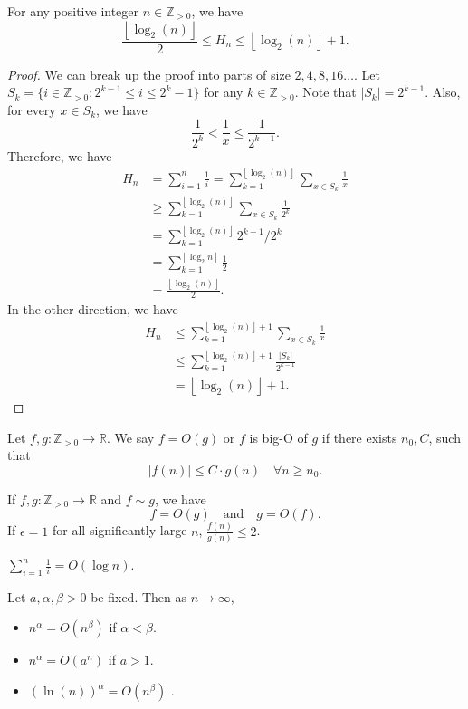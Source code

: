 \begin{lemma}
	For any positive integer \( n \in \mathbb{Z}_{>0} \), we have \[
		\frac{\left\lfloor \log _2(n) \right\rfloor}{2} \le H_n \le \left\lfloor \log _2(n) \right\rfloor + 1
	.\] 
\end{lemma}
\begin{proof}
	We can break up the proof into parts of size \( 2,4,8,16\ldots  \). Let \( S_k=\{i \in \mathbb{Z}_{>0} : 2^{k-1} \le i \le 2^{k}-1   \}   \) for any \( k \in \mathbb{Z}_{>0} \). Note that \( |S_k| = 2^{k-1}  \). Also, for every \( x \in  S_k \), we have \[
		\frac{1}{2^{k} } < \frac{1}{x} \le \frac{1}{2^{k-1} }
	.\] 
	Therefore, we have 
	\begin{align*}
		H_n &= \sum_{i=1}^{n} \frac{1}{i} = \sum_{k=1}^{\left\lfloor \log _2(n) \right\rfloor} \sum_{x \in S_k} \frac{1}{x} \\
				&\ge \sum_{k=1}^{\left\lfloor \log _2(n) \right\rfloor} \sum_{x \in S_k} \frac{1}{2^{k} } \\
		&= \sum_{k=1}^{\left\lfloor \log _2(n) \right\rfloor} 2^{k-1}/2^{k}   \\
		&= \sum_{k=1}^{\left\lfloor \log _2n \right\rfloor} \frac{1}{2} \\
		&= \frac{\left\lfloor \log _2(n) \right\rfloor}{2}
	.\end{align*}
	In the other direction, we have
	\begin{align*}
		H_n &\le \sum_{k=1}^{\left\lfloor \log _2(n) \right\rfloor+1} \sum_{x \in S_k} \frac{1}{x} \\
		&\le \sum_{k=1}^{\left\lfloor \log _2(n) \right\rfloor + 1} \frac{|S_k|}{2^{k-1} }  \\
		&= \left\lfloor \log _2(n) \right\rfloor + 1
	.\end{align*}
\end{proof}

\begin{definition}
	Let \( f,g : \mathbb{Z}_{>0}\to \mathbb{R} \). We say \( f=O(g) \) or \( f \) is big-O of \( g \) if there exists \( n_0,C \), such that \[
		|f(n)| \le C\cdot g(n) \quad \forall n\ge n_{0}
	.\] 
\end{definition}

\begin{note}
	If \( f,g :\mathbb{Z}_{>0}\to \mathbb{R} \) and \( f\sim g \), we have \[
		f=O(g) \quad \text{and} \quad g=O(f)
	.\] If \( \epsilon =1 \) for all significantly large \( n \), \( \frac{f(n)}{g(n)}\le 2 \).
\end{note}

\begin{eg}
	\( \sum_{i=1}^{n} \frac{1}{i} = O(\log n) \).
\end{eg}

\begin{lemma}
	Let \( a, \alpha ,\beta >0 \) be fixed. Then as \( n\to \infty \), 
	\begin{itemize}
		\item \( n^{\alpha } = O(n^{\beta } )  \) if \( \alpha <\beta  \).
		\item \( n^{\alpha } = O(a^{n} ) \) if \( a>1 \).
		\item \( (\ln (n))^{\alpha } =O(n^{\beta } ) \) .
	\end{itemize}
\end{lemma}
